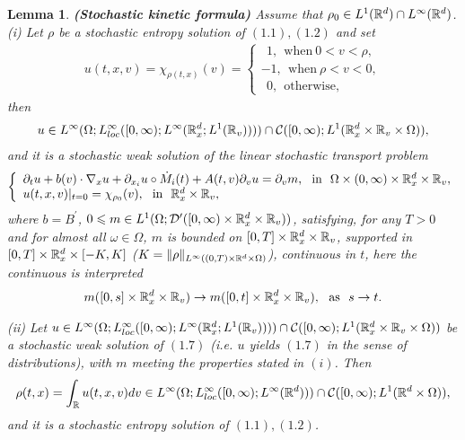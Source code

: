 \documentclass[11pt]{article}
\newtheorem{lemma}{Lemma}[section]
\begin{document}
\begin{lemma} \textbf{(Stochastic kinetic formula)} Assume that
$\rho_0\in L^1({\mathbb R}^d)\cap L^\infty({\mathbb R}^d)$. (i) Let $\rho$ be a
stochastic entropy solution of $(1.1), (1.2)$ and set
\begin{eqnarray}\label{1.5}
u(t,x,v)=\chi_{\rho(t,x)}(v)=\left\{
\begin{array}{ll} \ \ 1, \ \ \mbox{when} \ 0<v<\rho, \\
-1, \ \  \mbox{when} \ \rho<v<0, \\
\ \ 0, \  \ \mbox{otherwise},
\end{array}
\right.
\end{eqnarray}
then
\begin{eqnarray}\label{1.6}
u\in L^\infty(\Omega;L^\infty_{loc}([0,\infty);L^\infty({\mathbb
R}^d_x;L^1({{\mathbb R}}_v ))))\cap
{\mathcal C}([0,\infty);L^1({{\mathbb R}}^d_x\times{{\mathbb R}}_v\times \Omega)),
\end{eqnarray}
and it is a stochastic weak solution of the linear stochastic
transport problem
\begin{eqnarray}\label{1.7}
\left\{
  \begin{array}{ll}
\partial_tu+b(v)\cdot \nabla_{x} u
+\partial_{x_i}u\circ \dot{M}_i(t)
 +A(t,v)\partial_
vu=\partial_vm, \ \
 \mbox{in}
\ \  \Omega\times (0,\infty)\times {\mathbb R}^d_x\times{\mathbb R}_v,\\
u(t,x,v)|_{t=0}=\chi_{\rho_0}(v), \ \  \mbox{in} \ \
{\mathbb R}^d_x\times{\mathbb R}_v,
  \end{array}
\right.
\end{eqnarray}
where $b=B^\prime$, $0\leqslant m\in
L^1(\Omega;{\mathcal D}^{\prime}([0,\infty)\times {{\mathbb R}^d_x}\times {\mathbb R}_v))$,
satisfying, for any $T>0$ and for almost all $\omega\in \Omega$, $m$
is bounded on $[0,T]\times {\mathbb R}^d_x\times {\mathbb R}_v$, supported in
$[0,T]\times {\mathbb R}^d_x\times [-K,K]$
($K=\|\rho\|_{L^\infty((0,T)\times {\mathbb R}^d\times \Omega)}$),
continuous in $t$, here the continuous is interpreted
\begin{eqnarray}\label{1.8}
 m([0,s]\times {\mathbb R}^d_x\times{\mathbb R}_v)\rightarrow m([0,t]\times {\mathbb R}^d_x\times{\mathbb R}_v), \ \ \mbox{as} \ \
 s\rightarrow t.
\end{eqnarray}
 \vskip1mm\par
(ii) Let $u\in L^\infty(\Omega;L^\infty_{loc}([0,\infty);L^\infty(
{\mathbb R}^d_x;L^1({\mathbb R}_v))))\cap{\mathcal C}([0,\infty);L^1({{\mathbb R}}^d_x\times
{\mathbb R}_v\times \Omega))$ be a stochastic weak solution of $(1.7)$ (i.e.
$u$ yields $(1.7)$ in the sense of distributions), with $m$ meeting
the properties stated in $(i)$. Then
\begin{eqnarray}\label{1.9}
\rho (t,x)=\int_{{\mathbb R}}u(t,x,v)dv \in L^\infty(\Omega;
L^\infty_{loc}([0,\infty);L^\infty({\mathbb R}^d)))\cap
{\mathcal C}([0,\infty);L^1({{\mathbb R}}^d\times\Omega)),
\end{eqnarray}
and it is a stochastic entropy solution of $(1.1), (1.2)$.
 \end{lemma}
\end{document}
